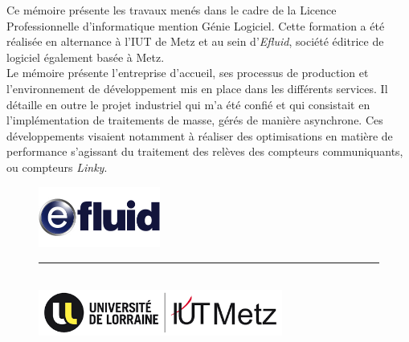 \documentclass[a4paper, 12pt]{report}
\begin{document}
Ce mémoire présente les travaux menés dans le cadre de la Licence Professionnelle d'informatique mention Génie Logiciel. Cette formation a été réalisée en alternance à l'IUT de Metz et au sein d'\textit{Efluid}, société éditrice de logiciel également basée à Metz.\\

Le mémoire présente l'entreprise d'accueil, ses processus de production et l'environnement de développement mis en place dans les différents services. Il détaille en outre le projet industriel qui m'a été confié et qui consistait en l'implémentation de traitements de masse, gérés de manière asynchrone. Ces développements visaient notamment à réaliser des optimisations en matière de performance s'agissant du traitement des relèves des compteurs communiquants, ou compteurs \textit{Linky}.

\begin{figure}[b]
  \begin{center}
    \includegraphics[height=2cm]{../res/logo-efluid.jpg}\\
    \rule{10cm}{0.2pt}\\
    \vspace{0.7cm}
    \includegraphics[height=1.5cm]{../res/logo-iut.png}
  \end{center}
\end{figure}
\end{document}
